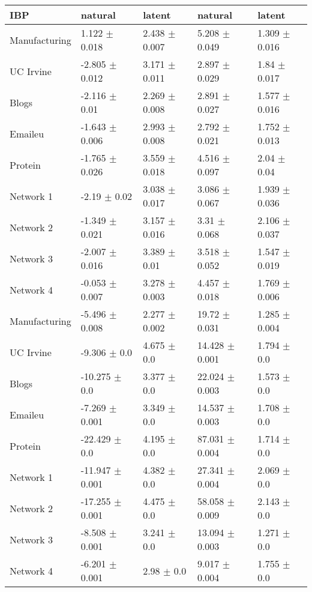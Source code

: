 \begin{tabular}{@{}lllll@{}}
\toprule

\textbf{IBP} & natural & latent & natural & latent \\\midrule

Manufacturing & 1.122 \(\pm\) 0.018 & 2.438 \(\pm\) 0.007 & 5.208
\(\pm\) 0.049 & 1.309 \(\pm\) 0.016 \\
UC Irvine & -2.805 \(\pm\) 0.012 & 3.171 \(\pm\) 0.011 & 2.897 \(\pm\)
0.029 & 1.84 \(\pm\) 0.017 \\
Blogs & -2.116 \(\pm\) 0.01 & 2.269 \(\pm\) 0.008 & 2.891 \(\pm\)
0.027 & 1.577 \(\pm\) 0.016 \\
Emaileu & -1.643 \(\pm\) 0.006 & 2.993 \(\pm\) 0.008 & 2.792 \(\pm\)
0.021 & 1.752 \(\pm\) 0.013 \\
Protein & -1.765 \(\pm\) 0.026 & 3.559 \(\pm\) 0.018 & 4.516 \(\pm\)
0.097 & 2.04 \(\pm\) 0.04 \\
Network 1 & -2.19 \(\pm\) 0.02 & 3.038 \(\pm\) 0.017 & 3.086 \(\pm\)
0.067 & 1.939 \(\pm\) 0.036 \\
Network 2 & -1.349 \(\pm\) 0.021 & 3.157 \(\pm\) 0.016 & 3.31 \(\pm\)
0.068 & 2.106 \(\pm\) 0.037 \\
Network 3 & -2.007 \(\pm\) 0.016 & 3.389 \(\pm\) 0.01 & 3.518 \(\pm\)
0.052 & 1.547 \(\pm\) 0.019 \\
Network 4 & -0.053 \(\pm\) 0.007 & 3.278 \(\pm\) 0.003 & 4.457 \(\pm\)
0.018 & 1.769 \(\pm\) 0.006 \\
Manufacturing & -5.496 \(\pm\) 0.008 & 2.277 \(\pm\) 0.002 & 19.72
\(\pm\) 0.031 & 1.285 \(\pm\) 0.004 \\
UC Irvine & -9.306 \(\pm\) 0.0 & 4.675 \(\pm\) 0.0 & 14.428 \(\pm\)
0.001 & 1.794 \(\pm\) 0.0 \\
Blogs & -10.275 \(\pm\) 0.0 & 3.377 \(\pm\) 0.0 & 22.024 \(\pm\)
0.003 & 1.573 \(\pm\) 0.0 \\
Emaileu & -7.269 \(\pm\) 0.001 & 3.349 \(\pm\) 0.0 & 14.537 \(\pm\)
0.003 & 1.708 \(\pm\) 0.0 \\
Protein & -22.429 \(\pm\) 0.0 & 4.195 \(\pm\) 0.0 & 87.031 \(\pm\)
0.004 & 1.714 \(\pm\) 0.0 \\
Network 1 & -11.947 \(\pm\) 0.001 & 4.382 \(\pm\) 0.0 & 27.341 \(\pm\)
0.004 & 2.069 \(\pm\) 0.0 \\
Network 2 & -17.255 \(\pm\) 0.001 & 4.475 \(\pm\) 0.0 & 58.058 \(\pm\)
0.009 & 2.143 \(\pm\) 0.0 \\
Network 3 & -8.508 \(\pm\) 0.001 & 3.241 \(\pm\) 0.0 & 13.094 \(\pm\)
0.003 & 1.271 \(\pm\) 0.0 \\
Network 4 & -6.201 \(\pm\) 0.001 & 2.98 \(\pm\) 0.0 & 9.017 \(\pm\)
0.004 & 1.755 \(\pm\) 0.0 \\

\bottomrule
\end{tabular}
